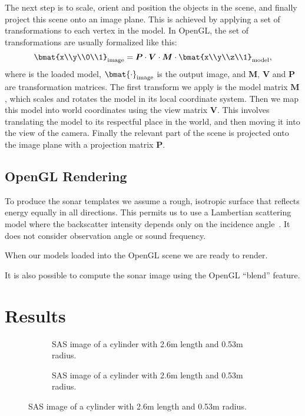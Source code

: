 \documentclass[
   UAM                                          %
 , 12pt                                         %
 , bibtex                                       %
 , layout
]{common/mytemplate}
\newcommand\mat[1]{\boldsymbol{#1}}
\renewcommand*\P{\mat P}
\newcommand*\V{\mat V}
\newcommand*\M{\mat M}
\begin{document}
The next step is to scale, orient and position the objects in the scene, and finally project this scene onto an image plane. This is achieved by applying a set of transformations to each vertex in the model. In OpenGL, the set of transformations are usually formalized like this:
\begin{align*}
\bmat{x\\y\\0\\1}_\text{image} = \P \cdot \V \cdot \M \cdot \bmat{x\\y\\z\\1}_\text{model},
\end{align*}
where is the loaded model, $\bmat{\cdot}_\text{image}$ is the output image, and $\M$, $\V$ and $\P$ are transformation matrices. The first transform we apply is the model matrix $\M$, which scales and rotates the model in its local coordinate system. Then we map this model into world coordinates using the view matrix $\V$. This involves translating the model to its respectful place in the world, and then moving it into the view of the camera. Finally the relevant part of the scene is projected onto the image plane with a projection matrix $\P$. 

\subsection{OpenGL Rendering}

To produce the sonar templates we assume a rough, isotropic surface that reflects energy equally in all directions. This permits us to use a Lambertian scattering model where the backscatter intensity depends only on the incidence angle~\cite{Zhang1999}. It does not consider observation angle or sound frequency.   

When our models loaded into the OpenGL scene we are ready to render. 



It is also possible to compute the sonar image using the OpenGL ``blend'' feature.


\section{Results}

\newlength\imgspacing\setlength\imgspacing{.5cm}

\begin{figure}[tp]\centering%
\begin{subfigure}[b]{.5\linewidth-\imgspacing/2}
%
\caption{SAS image of a cylinder with 2.6\;m length and 0.53\;m radius.}\label{data_sylinder}%
\end{subfigure}\hspace{\imgspacing}%
\begin{subfigure}[b]{.5\linewidth-\imgspacing/2}
%
\caption{SAS image of a cylinder with 2.6\;m length and 0.53\;m radius.}\label{data_cylinder_bw}%
\end{subfigure} 
\end{figure}
\end{document}
